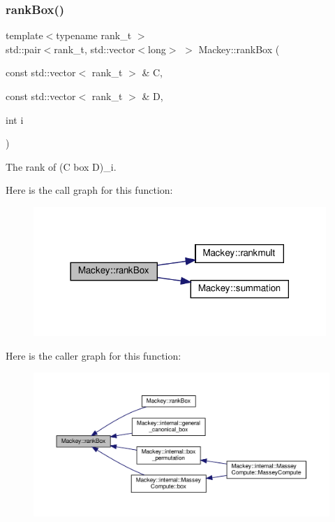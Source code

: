 \subsubsection{\texorpdfstring{rank\+Box()}{rankBox()}\hspace{0.1cm}{\footnotesize\ttfamily [1/2]}}
{\footnotesize\ttfamily template$<$typename rank\+\_\+t $>$ \\
std\+::pair$<$rank\+\_\+t, std\+::vector$<$long$>$ $>$ Mackey\+::rank\+Box (\begin{DoxyParamCaption}\item[{const std\+::vector$<$ rank\+\_\+t $>$ \&}]{C,  }\item[{const std\+::vector$<$ rank\+\_\+t $>$ \&}]{D,  }\item[{int}]{i }\end{DoxyParamCaption})}



The rank of (C box D)\+\_\+i. 

Here is the call graph for this function\+:\nopagebreak
\begin{figure}[H]
\begin{center}
\leavevmode
\includegraphics[width=314pt]{namespaceMackey_a8a3b4c6cc908044298e8e287298b9b99_cgraph}
\end{center}
\end{figure}
Here is the caller graph for this function\+:\nopagebreak
\begin{figure}[H]
\begin{center}
\leavevmode
\includegraphics[width=350pt]{namespaceMackey_a8a3b4c6cc908044298e8e287298b9b99_icgraph}
\end{center}
\end{figure}
\mbox{\label{namespaceMackey_a6ce409eccab63034e324323c1e528814}} 
